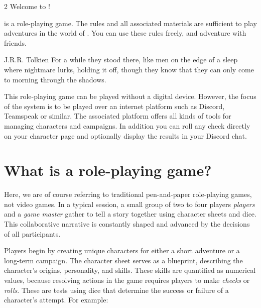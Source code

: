 \label{ch:introduction}

\begin{multicols}{2}
Welcome to \textit{}!

\textit{} is a role-playing game. The rules and all associated materials are sufficient to play adventures in the world of . You can use these rules freely, and adventure with friends.


\begin{pquote}{J.R.R. Tolkien}
For a while they stood there, like men on the edge of a sleep where nightmare lurks, holding it off, though they know that they can only come to morning through the shadows.
\end{pquote}

This role-playing game can be played without a digital device. However, the focus of the system is to be played over an internet platform such as Discord, Teamspeak or similar. The associated platform \href{\trans{book_website}}{} offers all kinds of tools for managing characters and campaigns. In addition you can roll any check directly on your character page and optionally display the results in your Discord chat.

\section{What is a role-playing game?} 

Here, we are of course referring to traditional pen-and-paper role-playing games, not video games. In a typical session, a small group of two to four players \textit{players} and a \textit{game master} gather to tell a story together using character sheets and dice. This collaborative narrative is constantly shaped and advanced by the decisions of all participants.

Players begin by creating unique characters for either a short adventure or a long-term campaign. The character sheet serves as a blueprint, describing the character's origins, personality, and skills. These skills are quantified as numerical values, because resolving actions in the game requires players to make \textit{checks} or \textit{rolls}. These are tests using dice that determine the success or failure of a character's attempt. For example:


\end{multicols}
